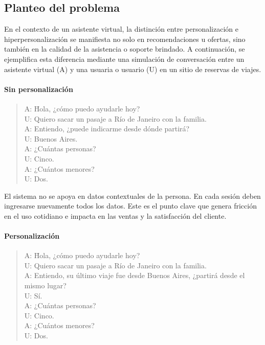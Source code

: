 \subsection{Planteo del problema}

En el contexto de un asistente virtual, la distinción entre personalización e hiperpersonalización se manifiesta no solo en recomendaciones u ofertas, sino también en la calidad de la asistencia o soporte brindado. A continuación, se ejemplifica esta diferencia mediante una simulación de conversación entre un asistente virtual (A) y una usuaria o usuario (U) en un sitio de reservas de viajes.

\paragraph{Sin personalización}
\begin{quote}
	\begin{tabbing}
		A: \= Hola, ¿cómo puedo ayudarle hoy? \\
		U: \> Quiero sacar un pasaje a Río de Janeiro con la familia. \\
		A: \> Entiendo, ¿puede indicarme desde dónde partirá? \\
		U: \> Buenos Aires. \\
		A: \> ¿Cuántas personas? \\
		U: \> Cinco. \\
		A: \> ¿Cuántos menores? \\
		U: \> Dos.
	\end{tabbing}
\end{quote}

El sistema no se apoya en datos contextuales de la persona. En cada sesión deben ingresarse nuevamente todos los datos. Este es el punto clave que genera fricción en el uso cotidiano e impacta en las ventas y la satisfacción del cliente.

\paragraph{Personalización}
\begin{quote}
	\begin{tabbing}
		A: \= Hola, ¿cómo puedo ayudarle hoy? \\
		U: \> Quiero sacar un pasaje a Río de Janeiro con la familia. \\
		A: \> Entiendo, su último viaje fue desde Buenos Aires, ¿partirá desde el mismo lugar? \\
		U: \> Sí. \\
		A: \> ¿Cuántas personas? \\
		U: \> Cinco. \\
		A: \> ¿Cuántos menores? \\
		U: \> Dos.
	\end{tabbing}
\end{quote}

